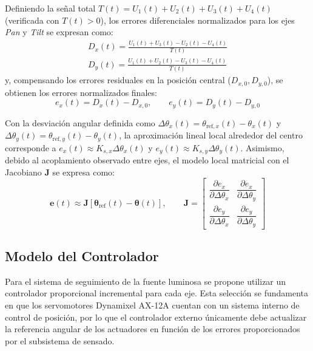 \documentclass[12pt,a4paper]{article}
\begin{document}
Definiendo la señal total $T(t) = U_1(t) + U_2(t) + U_3(t) + U_4(t)$ (verificada con $T(t) > 0$), los errores diferenciales normalizados para los ejes \emph{Pan} y \emph{Tilt} se expresan como:
\begin{align}
D_x(t) = \frac{U_1(t) + U_3(t) - U_2(t) - U_4(t)}{T(t)} \\
D_y(t) = \frac{U_1(t) + U_2(t) - U_3(t) - U_4(t)}{T(t)}
\end{align}
y, compensando los errores residuales en la posición central ($D_{x,0}, D_{y,0}$), se obtienen los errores normalizados finales:
\begin{equation}
e_x(t) = D_x(t) - D_{x,0}, \qquad e_y(t) = D_y(t) - D_{y,0}
\end{equation}

Con la desviación angular definida como $\Delta\theta_x(t) = \theta_{\mathrm{ref},x}(t) - \theta_x(t)$ y $\Delta\theta_y(t) = \theta_{\mathrm{ref},y}(t) - \theta_y(t)$, la aproximación lineal local alrededor del centro corresponde a $e_x(t) \approx K_{s,x}\Delta\theta_x(t)$ y $e_y(t) \approx K_{s,y}\Delta\theta_y(t)$. Asimismo, debido al acoplamiento observado entre ejes, el modelo local matricial con el Jacobiano $\mathbf{J}$ se expresa como:
\begin{equation}
\mathbf{e}(t) \approx \mathbf{J}\left[\boldsymbol{\theta}_{\mathrm{ref}}(t) - \boldsymbol{\theta}(t)\right], \qquad
\mathbf{J} = \begin{bmatrix}
\dfrac{\partial e_x}{\partial \Delta\theta_x} & \dfrac{\partial e_x}{\partial \Delta\theta_y} \\[8pt]
\dfrac{\partial e_y}{\partial \Delta\theta_x} & \dfrac{\partial e_y}{\partial \Delta\theta_y}
\end{bmatrix}
\end{equation}

\subsection{Modelo del Controlador}

Para el sistema de seguimiento de la fuente luminosa se propone utilizar un controlador proporcional incremental para cada eje. Esta selección se fundamenta en que los servomotores Dynamixel AX-12A cuentan con un sistema interno de control de posición, por lo que el controlador externo únicamente debe actualizar la referencia angular de los actuadores en función de los errores proporcionados por el subsistema de sensado.
\end{document}
